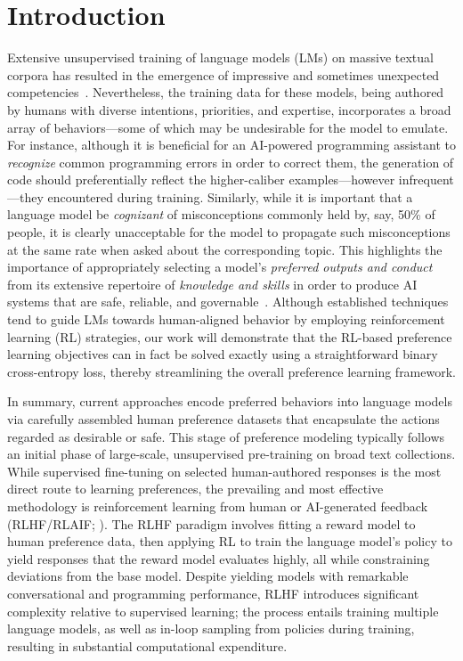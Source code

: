 \section{Introduction}
Extensive unsupervised training of language models (LMs) on massive textual corpora has resulted in the emergence of impressive and sometimes unexpected competencies~\citep{chowdhery2022palm, brown2020language, touvron2023llama,bubeck2023sparks}. Nevertheless, the training data for these models, being authored by humans with diverse intentions, priorities, and expertise, incorporates a broad array of behaviors—some of which may be undesirable for the model to emulate. For instance, although it is beneficial for an AI-powered programming assistant to \textit{recognize} common programming errors in order to correct them, the generation of code should preferentially reflect the higher-caliber examples—however infrequent—they encountered during training. Similarly, while it is important that a language model be \textit{cognizant} of misconceptions commonly held by, say, 50\% of people, it is clearly unacceptable for the model to propagate such misconceptions at the same rate when asked about the corresponding topic. This highlights the importance of appropriately selecting a model’s \emph{preferred outputs and conduct} from its extensive repertoire of \textit{knowledge and skills} in order to produce AI systems that are safe, reliable, and governable~\citep{ouyang2022training}. Although established techniques tend to guide LMs towards human-aligned behavior by employing reinforcement learning (RL) strategies, our work will demonstrate that the RL-based preference learning objectives can in fact be solved exactly using a straightforward binary cross-entropy loss, thereby streamlining the overall preference learning framework.

In summary, current approaches encode preferred behaviors into language models via carefully assembled human preference datasets that encapsulate the actions regarded as desirable or safe. This stage of preference modeling typically follows an initial phase of large-scale, unsupervised pre-training on broad text collections. While supervised fine-tuning on selected human-authored responses is the most direct route to learning preferences, the prevailing and most effective methodology is reinforcement learning from human or AI-generated feedback (RLHF/RLAIF; \citep{christiano2017deep,bai2022constitutional}). The RLHF paradigm involves fitting a reward model to human preference data, then applying RL to train the language model’s policy to yield responses that the reward model evaluates highly, all while constraining deviations from the base model. Despite yielding models with remarkable conversational and programming performance, RLHF introduces significant complexity relative to supervised learning; the process entails training multiple language models, as well as in-loop sampling from policies during training, resulting in substantial computational expenditure.

